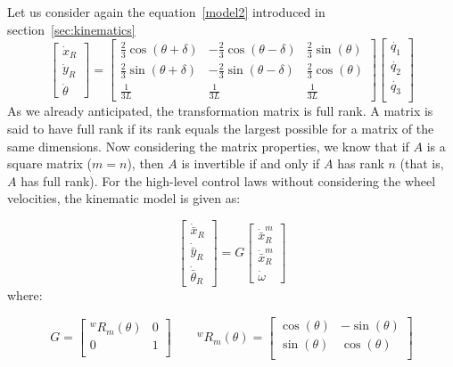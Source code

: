 Let us consider again the equation~\ref{model2} introduced in section~\ref{sec:kinematics}
\begin{equation*}
	\begin{bmatrix}
		\dot{x}_R\\
		\dot{y}_R\\
		\dot{\theta}
	\end{bmatrix} =
	\begin{bmatrix}
		\frac{2}{3}\cos(\theta+\delta) & -\frac{2}{3}\cos(\theta-\delta) & \frac{2}{3}\sin(\theta)\\
		\frac{2}{3}\sin(\theta+\delta) & -\frac{2}{3}\sin(\theta-\delta) & \frac{2}{3}\cos(\theta)\\
		\frac{1}{3L} & \frac{1}{3L} & \frac{1}{3L}
	\end{bmatrix}
	\begin{bmatrix}
		\dot{q_1}\\
		\dot{q_2}\\
		\dot{q_3}\\
	\end{bmatrix}	
\end{equation*}
As we already anticipated, the transformation matrix is full rank. A matrix is said to have full rank if its rank equals the largest possible for a matrix of the same dimensions. Now considering the matrix properties, we know that if $A$ is a square matrix ($m = n$), then $A$ is invertible if and only if $A$ has rank $n$ (that is, $A$ has full rank). For the high-level control laws without considering the wheel velocities, the kinematic model is given as:

\begin{equation}
\begin{bmatrix}
\dot{\bar{x}}_R\\
\dot{\bar{y}}_R\\
\dot{\bar{\theta}}_R
\end{bmatrix}
= G
\begin{bmatrix}
\dot{\bar{x}}_R^m\\
\dot{\bar{x}}_R^m\\
\dot{\omega}
\end{bmatrix}
\label{eq:control_law}
\end{equation}
where:

\begin{equation}
G=\begin{bmatrix}
^wR_m(\theta) & 0\\
0 & 1\\
\end{bmatrix}\qquad
^wR_m(\theta)=\begin{bmatrix}
\cos(\theta) &-\sin(\theta)\\
\sin(\theta) & \cos(\theta)\\
\end{bmatrix}
\end{equation}

